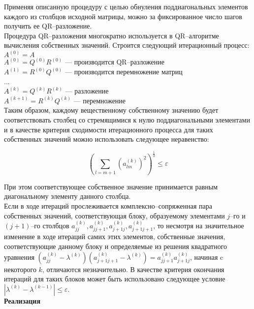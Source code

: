 Применяя описанную процедуру с целью обнуления поддиагональных элементов каждого из столбцов исходной матрицы, можно за фиксированное число шагов получить ее QR--разложение.\\

Процедура QR--разложения многократно используется в QR--алгоритме вычисления собственных значений. Строится следующий итерационный процесс:\\

$A^{(0)}=A$\\
$A^{(0)}=Q^{(0)}R^{(0)}$ --- производится QR--разложение\\
$A^{(1)}=R^{(0)}Q^{(0)}$ --- производится перемножение матриц\\
...\\
$A^{(k)}=Q^{(k)}R^{(k)}$ --- разложение\\
$A^{(k+1)}=R^{(k)}Q^{(k)}$ --- перемножение\\

Таким образом, каждому вещественному собственному значению будет соответствовать столбец со стремящимися к нулю поддиагональными элементами и в качестве критерия сходимости итерационного процесса для таких собственных значений можно использовать следующее неравенство:

$$
(\sum_{l=m+1}(a_{lm}^{(k)})^2)^\frac{1}{2} \leq \varepsilon
$$

При этом соответствующее собственное значение принимается равным диагональному элементу данного столбца.\\

Если в ходе итераций прослеживается комплексно--сопряженная пара собственных значений, соответствующая блоку, образуемому элементами $j$--го и $(j+1)$--го столбцов $a_{jj}^{(k)}, a_{jj+1}^{(k)}, a_{j+1j}^{(k)}, a_{j+1j+1}^{(k)}$, то несмотря на значительное изменение в ходе итераций самих этих элементов, собственные значения, соответствующие данному блоку и определяемые из решения квадратного уравнения $(a_{jj}^{(k)}-\lambda^{(k)})(a_{j+1j+1}^{(k)}-\lambda^{(k)})=a_{jj+1}^{(k)}a_{j+1j}^{(k)}$, начиная c некоторого $k$, отличаются незначительно. В качестве критерия окончания итераций для таких блоков может быть использовано следующее условие $|\lambda^{(k)}-\lambda^{(k-1)}| \leq \varepsilon$.\\

\textbf{Реализация}

\begin{lstlisting}

\end{lstlisting}
\vspace{0.5cm}

